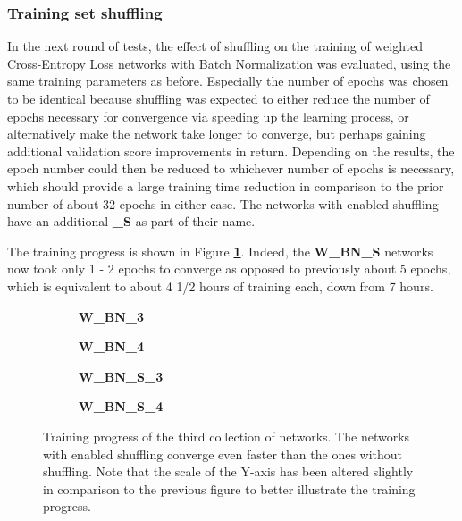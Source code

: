 	\subsubsection{Training set shuffling}

In the next round of tests, the effect of shuffling on the training of weighted Cross-Entropy Loss networks with Batch Normalization was evaluated, using the same training parameters as before. Especially the number of epochs was chosen to be identical because shuffling was expected to either reduce the number of epochs necessary for convergence via speeding up the learning process, or alternatively make the network take longer to converge, but perhaps gaining additional validation score improvements in return. Depending on the results, the epoch number could then be reduced to whichever number of epochs is necessary, which should provide a large training time reduction in comparison to the prior number of about 32 epochs in either case. The networks with enabled shuffling have an additional \textbf{\_S} as part of their name.

The training progress is shown in Figure \textbf{\ref{fig:weighted_batchnorm_shuffle_training}}. Indeed, the \textbf{W\_BN\_S} networks now took only 1 - 2 epochs to converge as opposed to previously about 5 epochs, which is equivalent to about 4 1/2 hours of training each, down from 7 hours.


\begin {figure}[!htb]
	\begin {subfigure}[b]{0.4\linewidth}
		\scalebox{0.65}{}
		\caption{\textbf{W\_BN\_3}}
	\end {subfigure}\hspace{1.75cm}
	\begin {subfigure}[b]{0.4\linewidth}
		\scalebox{0.65}{}
		\caption{\textbf{W\_BN\_4}}
	\end {subfigure}

	\begin {subfigure}[b]{0.4\linewidth}
		\scalebox{0.65}{}
		\caption{\textbf{W\_BN\_S\_3}}
	\end {subfigure}\hspace{1.75cm}
	\begin {subfigure}[b]{0.4\linewidth}
		\scalebox{0.65}{}
		\caption{\textbf{W\_BN\_S\_4}}
	\end {subfigure}

		\caption[Training progress of the third collection of networks.]{Training progress of the third collection of networks. The networks with enabled shuffling converge even faster than the ones without shuffling. Note that the scale of the Y-axis has been altered slightly in comparison to the previous figure to better illustrate the training progress.}
		\label{fig:weighted_batchnorm_shuffle_training}
\end {figure}


